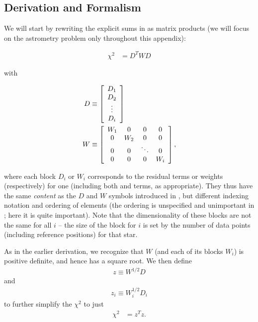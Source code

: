 \subsection{Derivation and Formalism}

We will start by rewriting the explicit sums in  as matrix products (we will focus on the astrometry problem only throughout this appendix):

\begin{align}
    \chi^{2} & = D^T W D
\end{align}

with

\begin{align}
    D & \equiv \left[
        \begin{array}{ c }
            D_1 \\
            D_2 \\
            \vdots \\
            D_i
        \end{array}
    \right] \\
    W & \equiv \left[
        \begin{array}{ c c c c }
               W_1 & 0 & 0 & 0 \\
            0 &    W_2 & 0 & 0 \\
            0 & 0 & \ddots & 0 \\
            0 & 0 & 0 &    W_i
        \end{array}
    \right],
\end{align}

where each block $D_i$ or $W_i$ corresponds to the residual terms or weights (respectively) for one  (including both  and  terms, as appropriate).
They thus have the same \emph{content} as the $D$ and $W$ symbols introduced in , but different indexing notation and ordering of elements (the ordering is unspecified and unimportant in ; here it is quite important).
Note that the dimensionality of these blocks are not the same for all $i$ -- the size of the block for  $i$ is set by the number of data points (including reference positions) for that star.

As in the earlier derivation, we recognize that $W$ (and each of its blocks $W_i$) is positive definite, and hence has a square root.
We then define
\begin{align}
    z \equiv W^{1/2}D
\end{align}
and
\begin{align}
    z_i \equiv W_i^{1/2}D_i
\end{align}
to further simplify the $\chi^2$ to just
\begin{align}
    \chi^{2} & = z^Tz .
\end{align}

